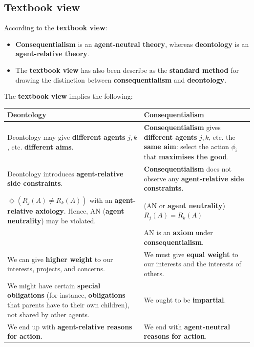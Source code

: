 \documentclass[11pt]{article}
\begin{document}
 \newpage
\subsection{Textbook view}
\label{sec:org163945a}
According to the \textbf{textbook view}:
\begin{itemize}
\item \textbf{Consequentialism} is an \textbf{agent-neutral theory}, whereas \textbf{deontology} is an \textbf{agent-relative theory}.
\item The \textbf{textbook view} has also been describe as the \textbf{standard method} for drawing the distinction between \textbf{consequentialism} and \textbf{deontology}.
\end{itemize}

The \textbf{textbook view} implies the following:
\begin{center}
\begin{tabularx}{\textwidth}{|X|X|}
\hline
Deontology & Consequentialism\\
\hline
Deontology may give \textbf{different agents} \(j, k\), etc. \textbf{different aims}. & \textbf{Consequentialism} gives \textbf{different agents} \(j, k\), etc. the \textbf{same aim}: select the action \(\phi_i\) that \textbf{maximises the good}.\\
\hline
Deontology introduces \textbf{agent-relative side constraints}. & \textbf{Consequentialism} does not observe any \textbf{agent-relative side constraints}.\\
\hline
\(\Diamond(R_j (A) \ne R_k (A))\) with an \textbf{agent-relative axiology}. Hence, AN (\textbf{agent neutrality}) may be violated. & (AN or \textbf{agent neutrality}) \(R_j (A) = R_k (A)\)\\
 & AN is an \textbf{axiom} under \textbf{consequentialism}.\\
\hline
We can give \textbf{higher weight} to our interests, projects, and concerns. & We must give \textbf{equal weight} to our interests and the interests of others.\\
\hline
We might have certain \textbf{special obligations} (for instance, \textbf{obligations} that parents have to their own children), not shared by other agents. & We ought to be \textbf{impartial}.\\
\hline
We end up with \textbf{agent-relative reasons for action}. & We end with \textbf{agent-neutral reasons for action}.\\
\hline
\end{tabularx}
\end{center}
\end{document}
